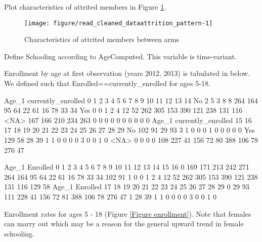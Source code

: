Plot characteristics of attrited members in \textsf{\small Figure \ref{Figure attrition pattern}}.
\begin{Schunk}
\begin{figure}

{\centering \texttt{[image: figure/read\_cleaned\_dataattrition\_pattern-1]} 

}

\caption[Characteristics of attrited members between arms]{Characteristics of attrited members between arms}\label{Figure attrition pattern}
\end{figure}
\end{Schunk}




Define \textsf{Schooling} according to \textsf{AgeComputed}. This variable is time-variant. \gobblepars

Enrollment by age at first observation (years 2012, 2013) is tabulated in below. We defined such that \textsf{Enrolled}==\textsf{currently\_enrolled} for ages 5-18.
\begin{Schunk}
\begin{Soutput}
                  Age_1
currently_enrolled   0   1   2   3   4   5   6   7   8   9  10  11  12  13  14
              No     2   5   3   8   8 264 164  95  64  22  61  16  78  33  34
              Yes    0   0   1   2   4  12  52 262 305 153 390 121 238 131 116
              <NA> 167 166 210 234 263   0   0   0   0   0   0   0   0   0   0
                  Age_1
currently_enrolled  15  16  17  18  19  20  21  22  23  24  25  26  27  28  29
              No   102  91  29  93   3   1   0   0   0   1   0   0   0   0   0
              Yes  129  58  28  39   1   1   0   0   0   0   3   0   0   1   0
              <NA>   0   0   0   0 108 227  41 156  72  80 388 106  78 276  47
\end{Soutput}
\begin{Soutput}
        Age_1
Enrolled   0   1   2   3   4   5   6   7   8   9  10  11  12  13  14  15  16
       0 169 171 213 242 271 264 164  95  64  22  61  16  78  33  34 102  91
       1   0   0   1   2   4  12  52 262 305 153 390 121 238 131 116 129  58
        Age_1
Enrolled  17  18  19  20  21  22  23  24  25  26  27  28  29
       0  29  93 111 228  41 156  72  81 388 106  78 276  47
       1  28  39   1   1   0   0   0   0   3   0   0   1   0
\end{Soutput}
\end{Schunk}
Enrollment rates for ages 5 - 18 (\textsf{\small Figure \ref{Figure enrollment}}). Note that females can marry out which may be a reason for the general upward trend in female schooling.

